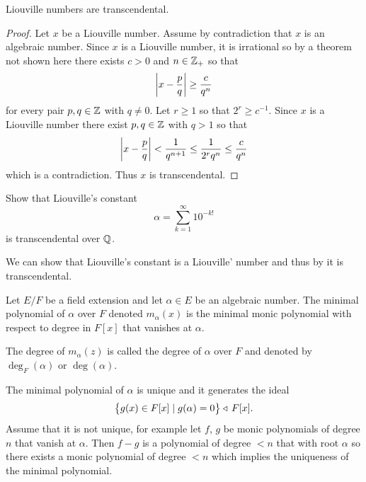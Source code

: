 \documentclass[11pt,a4paper]{article}
\begin{document}
\begin{theorem}
  \label{thm:liouville}
  Liouville numbers are transcendental.
\end{theorem}
\begin{proof}
  Let $x$ be a Liouville number.
  Assume by contradiction that $x$ is an algebraic number.
  Since $x$ is a Liouville number, it is irrational
  so by a theorem not shown here
  there exists $c > 0$ and $n \in \mathbb{Z}_+$ so that
  \[
    \left\lvert x - \frac{p}{q}\right\rvert \geq \frac{c}{q^n}
  \]
  for every pair $p,q \in \mathbb{Z}$ with $q \neq 0$.
  Let $r \geq 1$ so that $2^{r} \geq c^{-1}$.
  Since $x$ is a Liouville number there exist $p,q \in \mathbb{Z}$ with $q > 1$
  so that
  \begin{align*}
    \left\lvert x - \frac{p}{q}\right\rvert < \frac{1}{q^{n+1}}
                          \le \frac{1}{2^r q^n}
                          \le \frac{c}{q^n}
  \end{align*}
  which is a contradiction.
  Thus $x$ is transcendental.
\end{proof}

\begin{exercise}
  Show that Liouville's constant 
  \[
    \alpha = \sum_{k=1}^{\infty} 10^{-k!}
  \]
  is transcendental over $\mathbb{Q}$.
\end{exercise}
\begin{solution}
  We can show that Liouville's constant is a Liouville' number
  and thus by  it is transcendental.
\end{solution}

\begin{definition}
  Let $E/F$ be a field extension and let $\alpha \in E$ be an algebraic number.
  The minimal polynomial of $\alpha$ over $F$ denoted $m_{\alpha}(x)$
  is the minimal monic polynomial with respect to degree in $F[x]$ that vanishes
  at $\alpha$.
\end{definition}
\begin{remark}
  The degree of $m_{\alpha}(z)$ is called the degree of $\alpha$ over $F$
  and denoted by $\deg_F(\alpha)$ or $\deg(\alpha)$.
\end{remark}
\begin{remark}
  The minimal polynomial of $\alpha$ is unique and it generates the ideal
  \[
    \left\{g(x) \in F[x] \mid g(\alpha) = 0\right\} \triangleleft\, F[x].
  \]
  Assume that it is not unique, for example let $f$, $g$ be monic polynomials
  of degree $n$ that vanish at $\alpha$.
  Then $f - g$ is a polynomial of degree $< n$ that with root $\alpha$
  so there exists a monic polynomial of degree $< n$ which implies
  the uniqueness of the minimal polynomial.
\end{remark}
\end{document}
